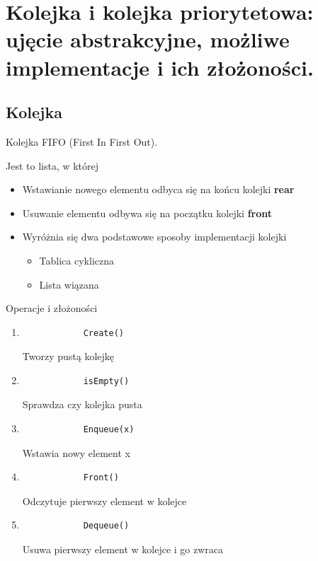 \documentclass[12pt]{article}
\begin{document}
    \section{Kolejka i kolejka priorytetowa: ujęcie abstrakcyjne, możliwe implementacje i ich złożoności.}
    \subsection{Kolejka}
    \begin{definition}
        Kolejka FIFO (First In First Out).

        Jest to lista, w której
        \begin{itemize}
            \item Wstawianie nowego elementu odbyca się na końcu kolejki \textbf{rear}
            \item Usuwanie elementu odbywa się na początku kolejki \textbf{front}\\
            \item Wyróżnia się dwa podstawowe sposoby implementacji kolejki
            \begin{itemize}
                \item Tablica cykliczna
                \item Lista wiązana
            \end{itemize}
        \end{itemize}
    \end{definition}

    Operacje i złożoności
    \begin{enumerate}
        \item
        \begin{verbatim}
            Create()
        \end{verbatim}
        Tworzy pustą kolejkę
        \item
        \begin{verbatim}
            isEmpty()
        \end{verbatim}
        Sprawdza czy kolejka pusta
        \item
        \begin{verbatim}
            Enqueue(x)
        \end{verbatim}
        Wstawia nowy element x
        \item
        \begin{verbatim}
            Front()
        \end{verbatim}
        Odczytuje pierwszy element w kolejce
        \item
        \begin{verbatim}
            Dequeue()
        \end{verbatim}
        Usuwa pierwszy element w kolejce i go zwraca
    \end{enumerate}
\end{document}
